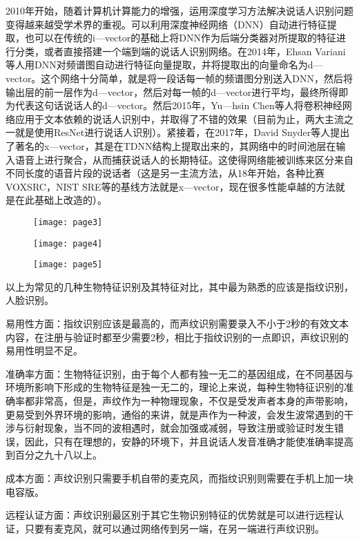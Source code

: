 \documentclass{article}
\begin{document}
2010年开始，随着计算机计算能力的增强，运用深度学习方法解决说话人识别问题变得越来越受学术界的重视。可以利用深度神经网络（DNN）自动进行特征提取，也可以在传统的i—vector的基础上将DNN作为后端分类器对所提取的特征进行分类，或者直接搭建一个端到端的说话人识别网络。在2014年，Ehsan Variani等人用DNN对频谱图自动进行特征向量提取，并将提取出的向量命名为d—vector。这个网络十分简单，就是将一段话每一帧的频谱图分别送入DNN，然后将输出层的前一层作为d—vector，然后对每一帧的d—vector进行平均，最终所得即为代表这句话说话人的d—vector。然后2015年，Yu—hsin Chen等人将卷积神经网络应用于文本依赖的说话人识别中，并取得了不错的效果（目前为止，两大主流之一就是使用ResNet进行说话人识别）。紧接着，在2017年，David Snyder等人提出了著名的x—vector，其是在TDNN结构上提取出来的，其网络中的时间池层在输入语音上进行聚合，从而捕获说话人的长期特征。这使得网络能被训练来区分来自不同长度的语音片段的说话者（这是另一主流方法，从18年开始，各种比赛VOXSRC，NIST SRE等的基线方法就是x—vector，现在很多性能卓越的方法就是在此基础上改造的）。\par 
\begin{figure}[h!]
	\centering
	\texttt{[image: page3]} 
\end{figure}
\begin{figure}[h!]
	\centering
	\texttt{[image: page4]} 
\end{figure}
\begin{figure}[h!]
	\centering
	\texttt{[image: page5]} 
\end{figure}
以上为常见的几种生物特征识别及其特征对比，其中最为熟悉的应该是指纹识别，人脸识别。\par 
易用性方面：指纹识别应该是最高的，而声纹识别需要录入不小于2秒的有效文本内容，在注册与验证时都至少需要2秒，相比于指纹识别的一点即识，声纹识别的易用性明显不足。\par 
准确率方面：生物特征识别，由于每个人都有独一无二的基因组成，在不同基因与环境所影响下形成的生物特征是独一无二的，理论上来说，每种生物特征识别的准确率都非常高，但是，声纹作为一种物理现象，不仅是受发声者本身的声带影响，更易受到外界环境的影响，通俗的来讲，就是声作为一种波，会发生波常遇到的干涉与衍射现象，当不同的波相遇时，就会加强或减弱，导致注册或验证时发生错误，因此，只有在理想的，安静的环境下，并且说话人发音准确才能使准确率提高到百分之九十八以上。 \par 
成本方面：声纹识别只需要手机自带的麦克风，而指纹识别则需要在手机上加一块电容版。\par 
远程认证方面：声纹识别最区别于其它生物识别特征的优势就是可以进行远程认证，只要有麦克风，就可以通过网络传到另一端，在另一端进行声纹识别。\par 
\end{document}
